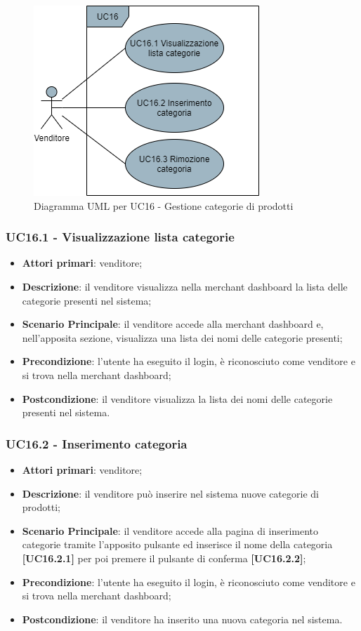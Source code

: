 \begin{figure}[H]
\centering
\includegraphics[scale=0.6]{res/UseCase/Immagini/GestioneCategorie}
\caption{Diagramma UML per UC16 - Gestione categorie di prodotti}
\end{figure}

\subsubsection{UC16.1 - Visualizzazione lista categorie}
\begin{itemize}
\item \textbf{Attori primari}: venditore;
\item \textbf{Descrizione}: il venditore visualizza nella merchant dashboard la lista delle categorie presenti nel sistema;
\item \textbf{Scenario Principale}: il venditore accede alla merchant dashboard e, nell'apposita sezione, visualizza una lista dei nomi delle categorie presenti;
\item \textbf{Precondizione}: l'utente ha eseguito il login, è riconosciuto come venditore e si trova nella merchant dashboard;
\item \textbf{Postcondizione}: il venditore visualizza la lista dei nomi delle categorie presenti nel sistema.
\end{itemize}

\subsubsection{UC16.2 - Inserimento categoria}
\begin{itemize}
\item \textbf{Attori primari}: venditore;
\item \textbf{Descrizione}: il venditore può inserire nel sistema nuove categorie di prodotti;
\item \textbf{Scenario Principale}: il venditore accede alla pagina di inserimento categorie tramite l'apposito pulsante ed inserisce il nome della categoria \textbf{[UC16.2.1]} per poi premere il pulsante di conferma \textbf{[UC16.2.2]};
\item \textbf{Precondizione}: l'utente ha eseguito il login, è riconosciuto come venditore e si trova nella merchant dashboard;
\item \textbf{Postcondizione}: il venditore ha inserito una nuova categoria nel sistema.
\end{itemize}


